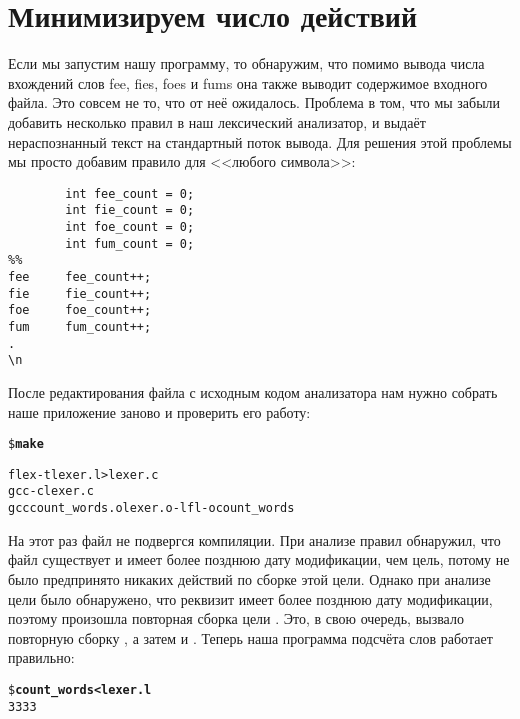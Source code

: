 \section{Минимизируем число действий}

Если мы запустим нашу программу, то обнаружим, что помимо вывода числа
вхождений слов fee, fies, foes и fums она также выводит содержимое
входного файла. Это совсем не то, что от неё ожидалось. Проблема в
том, что мы забыли добавить несколько правил в наш лексический
анализатор, и  выдаёт нераспознанный текст на
стандартный поток вывода. Для решения этой проблемы мы просто добавим
правило для <<любого символа>>:

{\footnotesize
\begin{verbatim}
        int fee_count = 0;
        int fie_count = 0;
        int foe_count = 0;
        int fum_count = 0;
%%
fee     fee_count++;
fie     fie_count++;
foe     foe_count++;
fum     fum_count++;
.
\n
\end{verbatim}
}

После редактирования файла с исходным кодом анализатора нам нужно
собрать наше приложение заново и проверить его работу:

{\footnotesize
\begin{alltt}
\$ \textbf{make}

flex -t lexer.l > lexer.c
gcc -c lexer.c
gcc count\_words.o lexer.o -lfl -ocount\_words
\end{alltt}
}

На этот раз файл  не подвергся компиляции.
При анализе правил \GNUmake{} обнаружил, что файл
 существует и имеет более позднюю дату
модификации, чем цель, потому не было предпринято никаких действий по
сборке этой цели. Однако при анализе цели  было
обнаружено, что реквизит  имеет более позднюю дату
модификации, поэтому произошла повторная сборка цели
. Это, в свою очередь, вызвало повторную сборку
, а затем и . Теперь наша
программа подсчёта слов работает правильно:

{\footnotesize
\begin{alltt}
\$ \textbf{count\_words < lexer.l}
3 3 3 3
\end{alltt}
}
